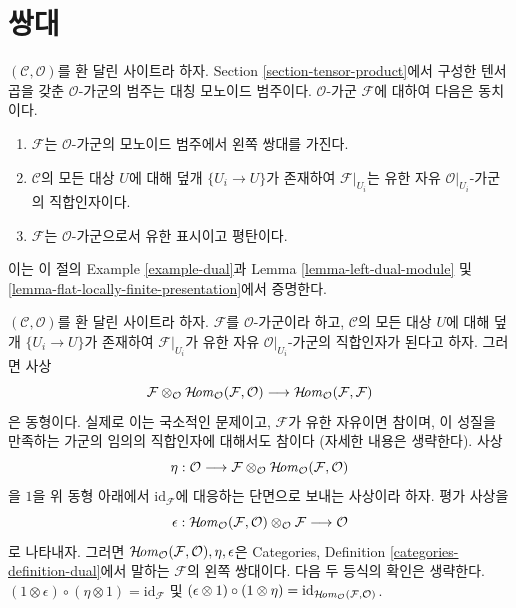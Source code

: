 \section{쌍대}
\label{section-duals}

\noindent
$(\mathcal{C}, \mathcal{O})$를 환 달린 사이트라 하자. Section
\ref{section-tensor-product}에서 구성한 텐서곱을 갖춘 $\mathcal{O}$-가군의
범주는 대칭 모노이드 범주이다. $\mathcal{O}$-가군 $\mathcal{F}$에 대하여
다음은 동치이다.
\begin{enumerate}
\item $\mathcal{F}$는 $\mathcal{O}$-가군의 모노이드 범주에서 왼쪽 쌍대를
가진다.
\item $\mathcal{C}$의 모든 대상 $U$에 대해 덮개 $\{U_i \to U\}$가 존재하여
$\mathcal{F}|_{U_i}$는 유한 자유 $\mathcal{O}|_{U_i}$-가군의 직합인자이다.
\item $\mathcal{F}$는 $\mathcal{O}$-가군으로서 유한 표시이고 평탄이다.
\end{enumerate}
이는 이 절의 Example \ref{example-dual}과 Lemma
\ref{lemma-left-dual-module} 및
\ref{lemma-flat-locally-finite-presentation}에서 증명한다.

\begin{example}
\label{example-dual}
$(\mathcal{C}, \mathcal{O})$를 환 달린 사이트라 하자. $\mathcal{F}$를
$\mathcal{O}$-가군이라 하고, $\mathcal{C}$의 모든 대상 $U$에 대해 덮개
$\{U_i \to U\}$가 존재하여 $\mathcal{F}|_{U_i}$가 유한 자유
$\mathcal{O}|_{U_i}$-가군의 직합인자가 된다고 하자. 그러면 사상
$$
\mathcal{F} \otimes_\mathcal{O}
\mathop{\mathcal{H}\!\mathit{om}}\nolimits_\mathcal{O}(\mathcal{F}, \mathcal{O})
\longrightarrow
\mathop{\mathcal{H}\!\mathit{om}}\nolimits_\mathcal{O}(\mathcal{F}, \mathcal{F})
$$
은 동형이다. 실제로 이는 국소적인 문제이고, $\mathcal{F}$가 유한 자유이면
참이며, 이 성질을 만족하는 가군의 임의의 직합인자에 대해서도 참이다
(자세한 내용은 생략한다). 사상
$$
\eta :
\mathcal{O}
\longrightarrow
\mathcal{F} \otimes_\mathcal{O}
\mathop{\mathcal{H}\!\mathit{om}}\nolimits_\mathcal{O}(\mathcal{F}, \mathcal{O})
$$
을 $1$을 위 동형 아래에서 $\text{id}_\mathcal{F}$에 대응하는 단면으로
보내는 사상이라 하자. 평가 사상을
$$
\epsilon : 
\mathop{\mathcal{H}\!\mathit{om}}\nolimits_\mathcal{O}(\mathcal{F}, \mathcal{O})
\otimes_\mathcal{O} \mathcal{F}
\longrightarrow
\mathcal{O}
$$
로 나타내자. 그러면
$\mathop{\mathcal{H}\!\mathit{om}}\nolimits_\mathcal{O}(\mathcal{F}, \mathcal{O}), \eta, \epsilon$은
Categories, Definition \ref{categories-definition-dual}에서 말하는
$\mathcal{F}$의 왼쪽 쌍대이다. 다음 두 등식의 확인은 생략한다.
$(1 \otimes \epsilon) \circ (\eta \otimes 1) = \text{id}_\mathcal{F}$
및
$(\epsilon \otimes 1) \circ (1 \otimes \eta) =
\text{id}_{\mathop{\mathcal{H}\!\mathit{om}}\nolimits_\mathcal{O}(\mathcal{F}, \mathcal{O})}$.
\end{example}

